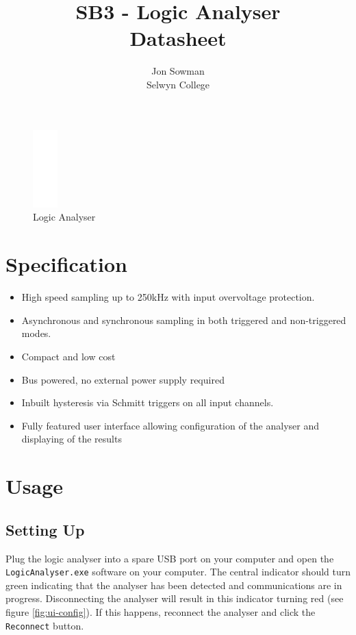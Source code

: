 \documentclass[11pt,twocolumn]{article}
\title{SB3 - Logic Analyser\\Datasheet}
\author{Jon Sowman\\Selwyn College}
\begin{document}
    \maketitle
	
    \begin{figure}
    \centering
    \includegraphics[height=3cm]{blank}
    \caption{Logic Analyser}
    \label{fig:la}
    \end{figure}

\section{Specification}
    \begin{itemize}
        \item High speed sampling up to 250kHz with input overvoltage
            protection.
        \item Asynchronous and synchronous sampling in both triggered and
            non-triggered modes.
        \item Compact and low cost
        \item Bus powered, no external power supply required
        \item Inbuilt hysteresis via Schmitt triggers on all input channels.
        \item Fully featured user interface allowing configuration of the
            analyser and displaying of the results
    \end{itemize}

\section{Usage}
\subsection{Setting Up}
    Plug the logic analyser into a spare USB port on your computer and open the
    \texttt{LogicAnalyser.exe} software on your computer. The central indicator
    should turn green indicating that the analyser has been detected and
    communications are in progress. Disconnecting the analyser will result in
    this indicator turning red (see figure \ref{fig:ui-config}). 
    If this happens, reconnect the analyser and
    click the \texttt{Reconnect} button.
\end{document}
